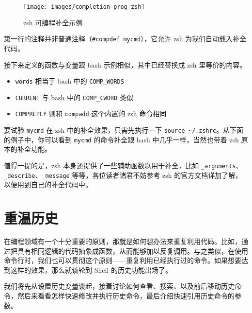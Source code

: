 \documentclass[]{ctexbook}
\newenvironment{Shaded}{\begin{snugshade}}{\end{snugshade}}
\newcommand{\ExtensionTok}[1]{#1}
\newcommand{\NormalTok}[1]{#1}
\providecommand{\tightlist}{%
  \setlength{\itemsep}{0pt}\setlength{\parskip}{0pt}}
\begin{document}
\begin{figure}
\texttt{[image: images/completion-prog-zsh]} \caption{zsh 可编程补全示例}\label{fig:completion-prog-zsh}
\end{figure}

第一行的注释并非普通注释（\texttt{\#compdef\ mycmd}），它允许 zsh 为我们自动载入补全代码。

接下来定义的函数与变量跟 bash 示例相似，其中已经替换成 zsh 里等价的内容。

\begin{itemize}
\tightlist
\item
  \texttt{words} 相当于 bash 中的 \texttt{COMP\_WORDS}
\item
  \texttt{CURRENT} 与 bash 中的 \texttt{COMP\_CWORD} 类似
\item
  \texttt{COMPREPLY} 则和 \texttt{compadd} 这个内置的 zsh 命令相同
\end{itemize}

要试验 \texttt{mycmd} 在 zsh 中的补全效果，只需先执行一下 \texttt{source\ \textasciitilde{}/.zshrc}。从下面的例子中，你可以看到 \texttt{mycmd} 的命令补全跟 bash 中几乎一样，当然也带着 zsh 原本的补全功能。

\begin{Shaded}
\end{Shaded}

值得一提的是，zsh 本身还提供了一些辅助函数以用于补全，比如 \texttt{\_arguments}、\texttt{\_describe}、\texttt{\_message} 等等，各位读者诸君不妨参考 zsh 的官方文档详加了解，以便用到自己的补全代码中。

\hypertarget{ux91cdux6e29ux5386ux53f2}{%
\chapter{重温历史}\label{ux91cdux6e29ux5386ux53f2}}

在编程领域有一个十分重要的原则，那就是如何想办法来重复利用代码。比如，通过把具有相同逻辑的代码抽象成函数，从而能够加以反复调用。与之类似，在使用命令行时，我们也可以贯彻这个原则------重复利用已经执行过的命令。如果想要达到这样的效果，那么就该轮到 Shell 的历史功能出场了。

我们将先从设置历史变量谈起，接着讨论如何查看、搜索、以及前后移动历史命令，然后来看看怎样快速修改并执行历史命令，最后介绍快速引用历史命令的参数。
\end{document}
